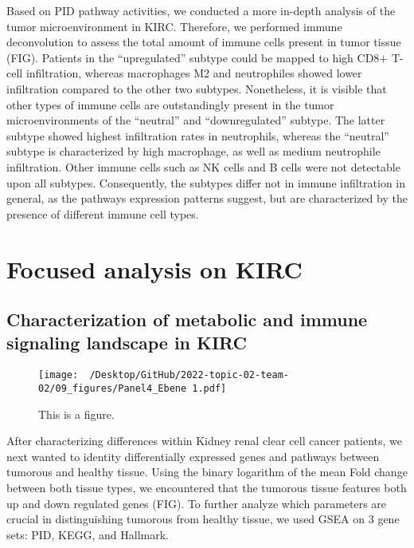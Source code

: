 \documentclass[
  parskip,
  oneside]{scrreprt}
\begin{document}
Based on PID pathway activities, we conducted a more in-depth analysis
of the tumor microenvironment in KIRC. Therefore, we performed immune
deconvolution to assess the total amount of immune cells present in
tumor tissue (FIG). Patients in the ``upregulated'' subtype could be
mapped to high CD8+ T-cell infiltration, whereas macrophages M2 and
neutrophiles showed lower infiltration compared to the other two
subtypes. Nonetheless, it is visible that other types of immune cells
are outstandingly present in the tumor microenvironments of the
``neutral'' and ``downregulated'' subtype. The latter subtype showed
highest infiltration rates in neutrophils, whereas the ``neutral''
subtype is characterized by high macrophage, as well as medium
neutrophile infiltration. Other immune cells such as NK cells and B
cells were not detectable upon all subtypes. Consequently, the subtypes
differ not in immune infiltration in general, as the pathways expression
patterns suggest, but are characterized by the presence of different
immune cell types.

\hypertarget{focused-analysis-on-kirc}{%
\section{Focused analysis on KIRC}\label{focused-analysis-on-kirc}}

\hypertarget{characterization-of-metabolic-and-immune-signaling-landscape-in-kirc}{%
\subsection{Characterization of metabolic and immune signaling landscape
in
KIRC}\label{characterization-of-metabolic-and-immune-signaling-landscape-in-kirc}}

\begin{figure}
  \texttt{[image: ~/Desktop/GitHub/2022-topic-02-team-02/09\_figures/Panel4\_Ebene 1.pdf]}
  \caption{This is a figure.}
\end{figure}

After characterizing differences within Kidney renal clear cell cancer
patients, we next wanted to identity differentially expressed genes and
pathways between tumorous and healthy tissue. Using the binary logarithm
of the mean Fold change between both tissue types, we encountered that
the tumorous tissue features both up and down regulated genes (FIG). To
further analyze which parameters are crucial in distinguishing tumorous
from healthy tissue, we used GSEA on 3 gene sets: PID, KEGG, and
Hallmark.
\end{document}
